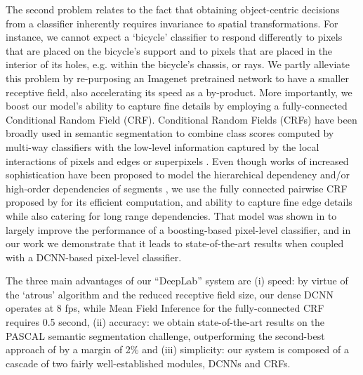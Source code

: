 The second problem relates to the fact that obtaining object-centric decisions
from a classifier inherently requires invariance to spatial
transformations. For instance, we cannot expect a `bicycle' classifier to
respond differently to pixels that are placed on the bicycle's support and to
pixels that are placed in the interior of its holes, e.g. within the bicycle's
chassis, or rays. We partly alleviate this problem by re-purposing an Imagenet pretrained network to have a smaller receptive field, also accelerating its speed as a by-product. More importantly, we boost our model's ability to capture fine details by employing a fully-connected Conditional Random Field (CRF).  
Conditional Random Fields (CRFs) have been broadly used in semantic segmentation to
combine class scores computed by multi-way classifiers with the low-level
information captured by the local interactions of pixels and edges
\citep{rother2004grabcut, shotton2009textonboost} or superpixels
\citep{lucchi2011spatial}. Even though works of increased sophistication have
been proposed to model the hierarchical dependency \citep{he2004multiscale,
  ladicky2009associative, lempitsky2011pylon} and/or high-order dependencies
of segments \citep{delong2012fast, gonfaus2010harmony, kohli2009robust, CPY13}, we
use the fully connected pairwise CRF proposed by
\citet{krahenbuhl2011efficient} for its efficient computation, and ability to
capture fine edge details while also catering for long range dependencies. That model was shown in
\citet{krahenbuhl2011efficient} to largely improve the performance of a
boosting-based pixel-level classifier, and in our work we demonstrate that it
leads to state-of-the-art results when coupled with a DCNN-based pixel-level
classifier.


The three main advantages of our ``DeepLab'' system are (i) speed: by virtue of the `atrous' algorithm and the reduced receptive field size, our dense DCNN operates at 8 fps, while Mean Field Inference for the fully-connected CRF requires 0.5 second, (ii) accuracy: we obtain state-of-the-art results on the PASCAL semantic segmentation challenge, outperforming the second-best approach of \citet{mostajabi2014feedforward} by a margin of 2$\%$ and (iii) simplicity: our system is composed of a cascade of two fairly well-established modules, DCNNs and CRFs. 

